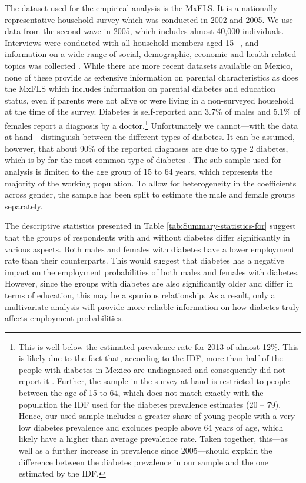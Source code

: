 The dataset used for the empirical analysis is the \acf{MxFLS}.
It is a nationally representative household survey which was conducted
in 2002 and 2005. We use data from the second wave in 2005, which
includes almost 40,000 individuals. Interviews were conducted with
all household members aged 15+, and information on a wide range of
social, demographic, economic and health related topics was collected
\parencite{Rubalcava2008}. While there are more recent datasets available
on Mexico, none of these provide as extensive information on parental
characteristics as does the \ac{MxFLS} which includes information
on parental diabetes and education status, even if parents were not
alive \DIFdelbegin {}\DIFdelend \DIFaddbegin {}\DIFaddend or were living in a non-surveyed household at the time
of the survey. Diabetes is self-reported and 3.7\% of males
and 5.1\% of females report a diagnosis by a doctor.\footnote{
This is well below the estimated prevalence rate for 2013
of almost 12\%. This is likely due to the fact that, according
to the \ac{IDF}, more than half of the people with diabetes in Mexico
are undiagnosed and consequently did not report it \parencite{InternationalDiabetesFederation2013}.
Further, the sample in the survey at hand is restricted to people
between the age of 15 to 64, which does not match exactly with the
population the \ac{IDF} used for the diabetes prevalence estimates
(20 -- 79). Hence, our used sample includes a greater share of young
people with a very low diabetes prevalence and excludes people above
64 years of age, which likely have a higher than average prevalence
rate. Taken together, this---as well as a further increase in prevalence
since 2005---should explain the difference between the diabetes
prevalence in our sample and the one estimated by the \ac{IDF}.
} Unfortunately we cannot---with the data at hand---distinguish
between the different types of diabetes. It can be assumed, however,
that about 90\% of the reported diagnoses are due to type 2
diabetes, which is by far the most common type of diabetes \parencite{Sicree2009}.
The sub-sample used for analysis is limited to the age group of 15
to 64 years, which represents the majority of the working population.
To allow for heterogeneity in the coefficients across gender, the
sample has been split to estimate the male and female groups separately. 

The descriptive statistics presented in Table \ref{tab:Summary-statistics-for}
suggest that the groups of respondents with and without diabetes differ
significantly in various aspects. Both males and females with diabetes
have a lower employment rate than their counterparts. This would suggest
that diabetes has a negative impact on the employment probabilities of both
males and females with diabetes. However, since the groups with diabetes
are also significantly older and differ in terms of education, this
may be a spurious relationship. As a result, only a multivariate analysis
will provide more reliable information on how diabetes truly affects
employment probabilities.


